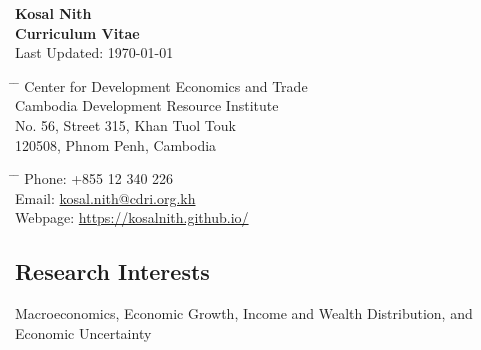 \documentclass[10pt,a4paper]{article}
\begin{document}

\begin{center}
	\Large{\textbf{Kosal Nith}}\\
	\large{\textbf{Curriculum Vitae}\\
	\normalsize Last Updated:	\today}
\end{center}

\parbox{0.5\textwidth}{ %
	\begin{tabbing} %
		\hspace{3cm} \= \hspace{4cm} \= \kill %
		Center for Development Economics and Trade \\
		Cambodia Development Resource Institute\\ 
		No. 56, Street 315, Khan Tuol Touk \\
		120508, Phnom Penh, Cambodia
		
		
\end{tabbing}}
\hfill %
\parbox{0.5\textwidth}{ %
	\begin{tabbing} %
		\hspace{3cm} \= \hspace{4cm} \= \kill %
		Phone: +855 12 340 226 \\ 
		Email: \href{mailto:kosal.nith@cdri.org.kh}{kosal.nith@cdri.org.kh}\\
		Webpage: \href{https://kosalnith.github.io/}{https://kosalnith.github.io/}  
\end{tabbing}}
\vspace{-1em}

\subsection*{Research Interests}	

	Macroeconomics, Economic Growth, Income and Wealth Distribution, and Economic Uncertainty
\end{document}

